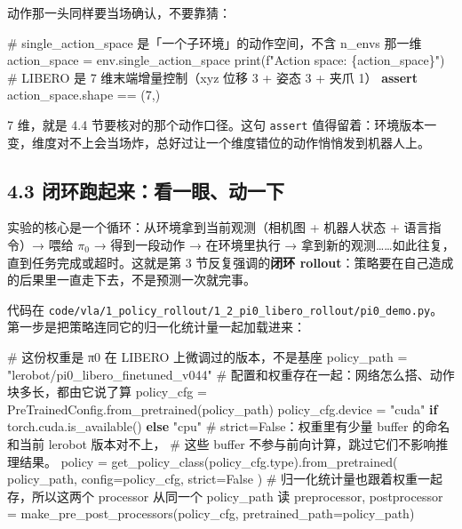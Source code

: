 \documentclass[
  chinese,
]{ctexart}
\newenvironment{Shaded}{\begin{snugshade}}{\end{snugshade}}
\newcommand{\BuiltInTok}[1]{\textcolor[rgb]{0.00,0.23,0.31}{#1}}
\newcommand{\CommentTok}[1]{\textcolor[rgb]{0.37,0.37,0.37}{#1}}
\newcommand{\ControlFlowTok}[1]{\textcolor[rgb]{0.00,0.23,0.31}{\textbf{#1}}}
\newcommand{\DecValTok}[1]{\textcolor[rgb]{0.68,0.00,0.00}{#1}}
\newcommand{\NormalTok}[1]{\textcolor[rgb]{0.00,0.23,0.31}{#1}}
\newcommand{\OperatorTok}[1]{\textcolor[rgb]{0.37,0.37,0.37}{#1}}
\newcommand{\SpecialCharTok}[1]{\textcolor[rgb]{0.37,0.37,0.37}{#1}}
\newcommand{\SpecialStringTok}[1]{\textcolor[rgb]{0.13,0.47,0.30}{#1}}
\newcommand{\StringTok}[1]{\textcolor[rgb]{0.13,0.47,0.30}{#1}}
\newcommand{\VariableTok}[1]{\textcolor[rgb]{0.07,0.07,0.07}{#1}}
\begin{document}
动作那一头同样要当场确认，不要靠猜：

\begin{Shaded}
\begin{Highlighting}[]
\CommentTok{\# single\_action\_space 是「一个子环境」的动作空间，不含 n\_envs 那一维}
\NormalTok{action\_space }\OperatorTok{=}\NormalTok{ env.single\_action\_space}
\BuiltInTok{print}\NormalTok{(}\SpecialStringTok{f"Action space: }\SpecialCharTok{\{}\NormalTok{action\_space}\SpecialCharTok{\}}\SpecialStringTok{"}\NormalTok{)}
\CommentTok{\# LIBERO 是 7 维末端增量控制（xyz 位移 3 + 姿态 3 + 夹爪 1）}
\ControlFlowTok{assert}\NormalTok{ action\_space.shape }\OperatorTok{==}\NormalTok{ (}\DecValTok{7}\NormalTok{,)}
\end{Highlighting}
\end{Shaded}

7 维，就是 4.4 节要核对的那个动作口径。这句 \texttt{assert}
值得留着：环境版本一变，维度对不上会当场炸，总好过让一个维度错位的动作悄悄发到机器人上。

\subsection{4.3
闭环跑起来：看一眼、动一下}\label{ux95edux73afux8dd1ux8d77ux6765ux770bux4e00ux773cux52a8ux4e00ux4e0b}

实验的核心是一个循环：从环境拿到当前观测（相机图 + 机器人状态 +
语言指令）→ 喂给 \(\pi_0\) → 得到一段动作 → 在环境里执行 →
拿到新的观测\ldots\ldots 如此往复，直到任务完成或超时。这就是第 3
节反复强调的\textbf{闭环
rollout}：策略要在自己造成的后果里一直走下去，不是预测一次就完事。

代码在
\texttt{code/vla/1\_policy\_rollout/1\_2\_pi0\_libero\_rollout/pi0\_demo.py}。第一步是把策略连同它的归一化统计量一起加载进来：

\begin{Shaded}
\begin{Highlighting}[]
    \CommentTok{\# 这份权重是 π0 在 LIBERO 上微调过的版本，不是基座}
\NormalTok{    policy\_path }\OperatorTok{=} \StringTok{"lerobot/pi0\_libero\_finetuned\_v044"}
    \CommentTok{\# 配置和权重存在一起：网络怎么搭、动作块多长，都由它说了算}
\NormalTok{    policy\_cfg }\OperatorTok{=}\NormalTok{ PreTrainedConfig.from\_pretrained(policy\_path)}
\NormalTok{    policy\_cfg.device }\OperatorTok{=} \StringTok{"cuda"} \ControlFlowTok{if}\NormalTok{ torch.cuda.is\_available() }\ControlFlowTok{else} \StringTok{"cpu"}
    \CommentTok{\# strict=False：权重里有少量 buffer 的命名和当前 lerobot 版本对不上，}
    \CommentTok{\# 这些 buffer 不参与前向计算，跳过它们不影响推理结果。}
\NormalTok{    policy }\OperatorTok{=}\NormalTok{ get\_policy\_class(policy\_cfg.}\BuiltInTok{type}\NormalTok{).from\_pretrained(}
\NormalTok{        policy\_path, config}\OperatorTok{=}\NormalTok{policy\_cfg, strict}\OperatorTok{=}\VariableTok{False}
\NormalTok{    )}
    \CommentTok{\# 归一化统计量也跟着权重一起存，所以这两个 processor 从同一个 policy\_path 读}
\NormalTok{    preprocessor, postprocessor }\OperatorTok{=}\NormalTok{ make\_pre\_post\_processors(policy\_cfg, pretrained\_path}\OperatorTok{=}\NormalTok{policy\_path)}
\end{Highlighting}
\end{Shaded}
\end{document}
